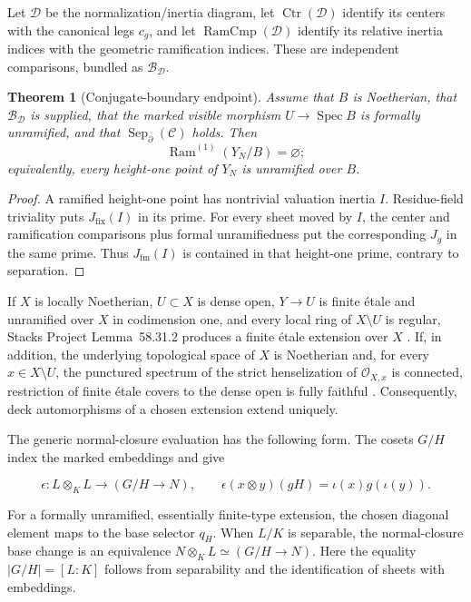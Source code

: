 \documentclass[11pt]{article}
\newtheorem{theorem}{Theorem}[section]
\theoremstyle{definition}
\theoremstyle{remark}
\DeclareMathOperator{\Spec}{Spec}
\begin{document}
Let \(\mathscr D\) be the normalization/inertia diagram, let
\(\operatorname{Ctr}(\mathscr D)\) identify its centers with the canonical
legs \(c_g\), and let \(\operatorname{RamCmp}(\mathscr D)\) identify its
relative inertia indices with the geometric ramification indices.  These are
independent comparisons, bundled as \(\mathscr B_{\mathscr D}\).

\begin{theorem}[Conjugate-boundary endpoint]
\label{thm:boundary-endpoint}
Assume that \(B\) is Noetherian, that
\(\mathscr B_{\mathscr D}\) is supplied, that the marked visible morphism
\(U\to\Spec B\) is formally unramified, and that
\(\operatorname{Sep}_{\partial}(\mathcal C)\) holds.  Then
\[
  \operatorname{Ram}^{(1)}(Y_N/B)=\varnothing;
\]
equivalently, every height-one point of \(Y_N\) is unramified over \(B\).
\end{theorem}

\begin{proof}
A ramified height-one point has nontrivial valuation inertia \(I\).
Residue-field triviality puts \(J_{\mathrm{fix}}(I)\) in its prime.  For
every sheet moved by \(I\), the center and ramification comparisons plus
formal unramifiedness put the corresponding \(J_g\) in the same prime.
Thus \(J_{\mathrm{fm}}(I)\) is contained in that height-one prime, contrary
to separation.
\end{proof}

If \(X\) is locally Noetherian, \(U\subset X\) is dense open,
\(Y\to U\) is finite \'etale and unramified over \(X\) in codimension one,
and every local ring of \(X\setminus U\) is regular, Stacks Project
Lemma~58.31.2 produces a finite \'etale extension over \(X\)
\cite{StacksFiniteEtaleCodimOneExtension}. If, in addition, the underlying
topological space of \(X\) is Noetherian and, for every
\(x\in X\setminus U\), the punctured spectrum of the strict henselization
of \(\mathcal O_{X,x}\) is connected, restriction of finite \'etale covers
to the dense open is fully faithful \cite{StacksFiniteEtaleFullFaithful}.
Consequently, deck automorphisms of a chosen extension extend uniquely.

The generic normal-closure evaluation has the following form.  The cosets
\(G/H\) index the marked embeddings and give

\[
  \epsilon:L\otimes_KL\longrightarrow (G/H\to N),
  \qquad
  \epsilon(x\otimes y)(gH)=\iota(x)g(\iota(y)).
\]

For a formally unramified, essentially finite-type extension, the chosen
diagonal element maps to the base selector \(q_H\). When \(L/K\) is
separable, the normal-closure base change is an equivalence
\(N\otimes_KL\simeq (G/H\to N)\). Here the equality
\(\lvert G/H\rvert=[L:K]\) follows from separability and the
identification of sheets with embeddings.
\end{document}
